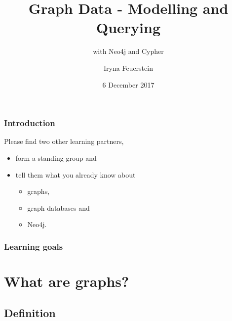 \documentclass[12pt]{beamer}
\title{Graph Data - Modelling and Querying}
\subtitle{with Neo4j and Cypher}
\author[I.Feuerstein]{Iryna Feuerstein}
\institute[Meetup]{Graph Database - NRW Meetup}
\date{6 December 2017}
\begin{document}
    
    \begin{frame}
        \frametitle{Introduction}
        Please find two other learning partners, 
        \begin{itemize}
            \item form a standing group and 
            \item tell them what you already know about \begin{itemize}
                \item graphs, 
                \item graph databases and 
                \item Neo4j.
            \end{itemize}
        \end{itemize}
    \end{frame}
    
    \maketitle
    
    \begin{frame}
        \frametitle{Learning goals}
        \tableofcontents
    \end{frame}
    
    \section{What are graphs?}
    \subsection{Definition}
    
\end{document}
